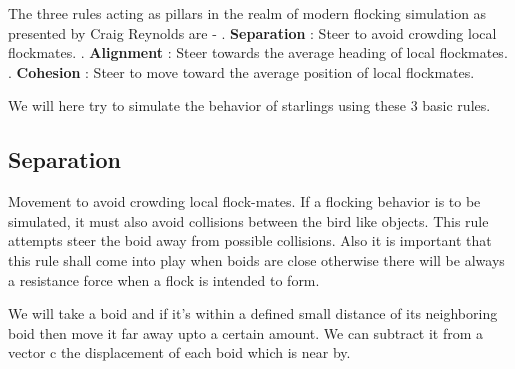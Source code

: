 \documentclass[12pt]{article}
\begin{document}
The three rules acting as pillars in the realm of modern flocking simulation as presented by Craig Reynolds are - 
\newline
{}. \textbf{Separation} : Steer to avoid crowding local flockmates.
. \textbf{Alignment} : Steer towards the average heading of local flockmates.
. \textbf{Cohesion} : Steer to move toward the average position of local flockmates.

We will here try to simulate the behavior of starlings using these 3 basic rules. 

\subsection{Separation}
Movement to avoid crowding local flock-mates. If a flocking behavior is to be simulated, it must also avoid collisions between the bird like objects. This rule attempts steer the boid away from possible collisions. Also it is important that this rule shall come into play when boids are close otherwise there will be always a resistance force when a flock is intended to form.
\newline

We will take a boid and if it's within a defined small distance of its neighboring boid then move it far away upto a certain amount. We can subtract it from a vector c the displacement of each boid which is near by.\newline
	
\end{document}
